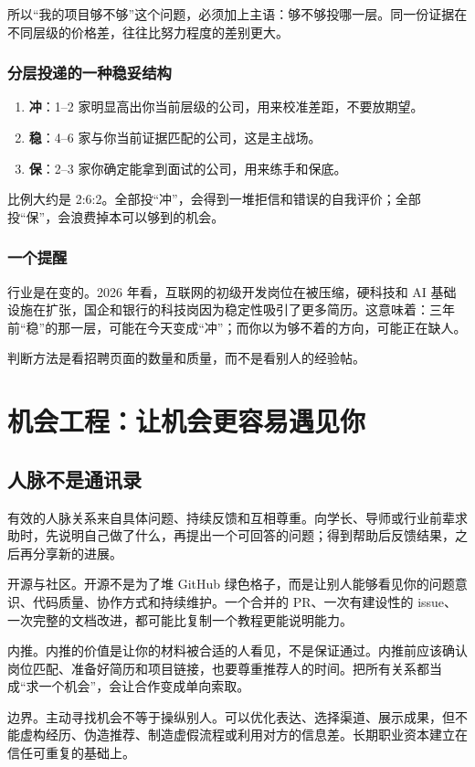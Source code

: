 \documentclass[UTF8,zihao=5,openany]{ctexbook}
\begin{document}
所以“我的项目够不够”这个问题，必须加上主语：够不够投哪一层。同一份证据在不同层级的价格差，往往比努力程度的差别更大。

\subsection{分层投递的一种稳妥结构}
\begin{enumerate}
\item \textbf{冲}：1--2 家明显高出你当前层级的公司，用来校准差距，不要放期望。
\item \textbf{稳}：4--6 家与你当前证据匹配的公司，这是主战场。
\item \textbf{保}：2--3 家你确定能拿到面试的公司，用来练手和保底。
\end{enumerate}

比例大约是 2:6:2。全部投“冲”，会得到一堆拒信和错误的自我评价；全部投“保”，会浪费掉本可以够到的机会。

\subsection{一个提醒}
行业是在变的。2026 年看，互联网的初级开发岗位在被压缩，硬科技和 AI 基础设施在扩张，国企和银行的科技岗因为稳定性吸引了更多简历。这意味着：三年前“稳”的那一层，可能在今天变成“冲”；而你以为够不着的方向，可能正在缺人。

判断方法是看招聘页面的数量和质量，而不是看别人的经验帖。


\chapter{机会工程：让机会更容易遇见你}
\section{人脉不是通讯录}
有效的人脉关系来自具体问题、持续反馈和互相尊重。向学长、导师或行业前辈求助时，先说明自己做了什么，再提出一个可回答的问题；得到帮助后反馈结果，之后再分享新的进展。

开源与社区。开源不是为了堆 GitHub 绿色格子，而是让别人能够看见你的问题意识、代码质量、协作方式和持续维护。一个合并的 PR、一次有建设性的 issue、一次完整的文档改进，都可能比复制一个教程更能说明能力。

内推。内推的价值是让你的材料被合适的人看见，不是保证通过。内推前应该确认岗位匹配、准备好简历和项目链接，也要尊重推荐人的时间。把所有关系都当成“求一个机会”，会让合作变成单向索取。

边界。主动寻找机会不等于操纵别人。可以优化表达、选择渠道、展示成果，但不能虚构经历、伪造推荐、制造虚假流程或利用对方的信息差。长期职业资本建立在信任可重复的基础上。
\end{document}
